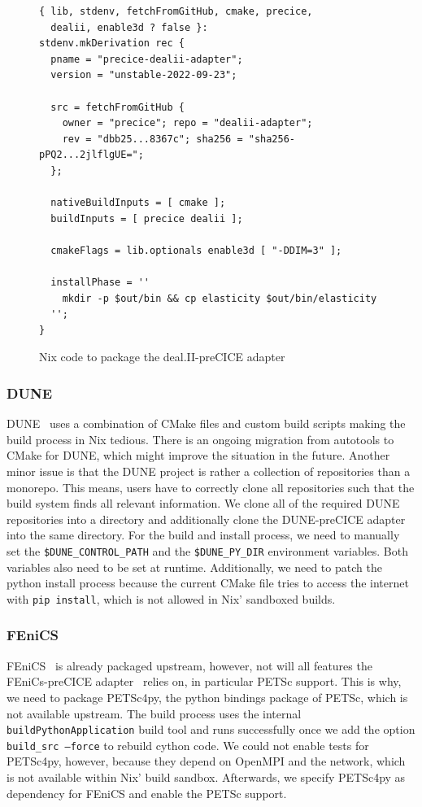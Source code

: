 \documentclass{eceasst}
\begin{document}
\begin{figure}
    \normalsize
    \begin{verbatim}
{ lib, stdenv, fetchFromGitHub, cmake, precice,
  dealii, enable3d ? false }:
stdenv.mkDerivation rec {
  pname = "precice-dealii-adapter";
  version = "unstable-2022-09-23";

  src = fetchFromGitHub {
    owner = "precice"; repo = "dealii-adapter";
    rev = "dbb25...8367c"; sha256 = "sha256-pPQ2...2jlflgUE=";
  };

  nativeBuildInputs = [ cmake ];
  buildInputs = [ precice dealii ];

  cmakeFlags = lib.optionals enable3d [ "-DDIM=3" ];

  installPhase = ''
    mkdir -p $out/bin && cp elasticity $out/bin/elasticity
  '';
}
    \end{verbatim}
    \caption{Nix code to package the deal.II-preCICE adapter}
    \label{lst:dealii-adapter-nix}
\end{figure}

\subsubsection{DUNE}

DUNE~\cite{bastian2020dune} uses a combination of CMake files and custom build scripts making the build process in Nix tedious.
There is an ongoing migration from autotools to CMake for DUNE, which might improve the situation in the future.
Another minor issue is that the DUNE project is rather a collection of repositories than a monorepo. This means, users have to correctly clone all repositories such that the build system finds all relevant information.
We clone all of the required DUNE repositories into a directory and additionally clone the DUNE-preCICE adapter into the same directory.
For the build and install process, we need to manually set the \texttt{\$DUNE\_CONTROL\_PATH} and the \texttt{\$DUNE\_PY\_DIR} environment variables. Both variables also need to be set at runtime.
Additionally, we need to patch the python install process because the current CMake file tries to access the internet with \texttt{pip install}, which is not allowed in Nix' sandboxed builds.

\subsubsection{FEniCS}

FEniCS~\cite{fenics} is already packaged upstream, however, not will all features the FEniCs-preCICE adapter~\cite{Rodenberg2021} relies on, in particular PETSc support.
This is why, we need to package PETSc4py, the python bindings package of PETSc, which is not available upstream.
The build process uses the internal \texttt{buildPythonApplication} build tool and runs successfully once we add the option \texttt{build\_src --force} to rebuild cython code.
We could not enable tests for PETSc4py, however, because they depend on OpenMPI and the network, which is not available within Nix' build sandbox.
Afterwards, we specify PETSc4py as dependency for FEniCS and enable the PETSc support.
\end{document}
